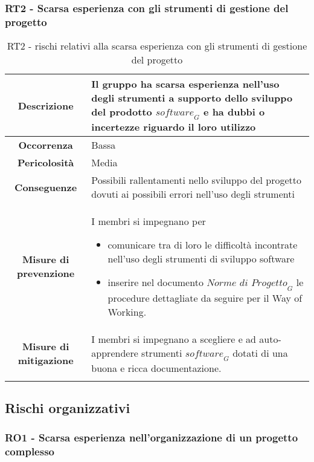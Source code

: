 \subsubsection[RT2]{RT2 - Scarsa esperienza con gli strumenti di gestione del progetto}\label{rt:2}
\begin{longtable}{|c|p{12cm}|}
\hline
\textbf{Descrizione} & Il gruppo ha scarsa esperienza nell'uso degli strumenti a supporto dello sviluppo del prodotto $\textit{software}_G$ e ha dubbi o incertezze riguardo il loro utilizzo \\
\hline
\textbf{Occorrenza} & Bassa \\
\hline
\textbf{Pericolosità} & Media \\
\hline
\textbf{Conseguenze} & Possibili rallentamenti nello sviluppo del progetto dovuti ai possibili errori nell'uso degli strumenti\\
\hline
\textbf{Misure di prevenzione} & 
I membri si impegnano per
\begin{itemize}
    \item comunicare tra di loro le difficoltà incontrate nell'uso degli strumenti di sviluppo software
    \item inserire nel documento $\textit{Norme di Progetto}_G$ le procedure dettagliate da seguire per il Way of Working.
\end{itemize} \\
\hline
\textbf{Misure di mitigazione} & I membri si impegnano a scegliere e ad auto-apprendere strumenti $\textit{software}_G$ dotati di una buona e ricca documentazione.\\
\hline
\caption{RT2 - rischi relativi alla scarsa esperienza con gli strumenti di gestione del progetto}
\end{longtable}

\subsection{Rischi organizzativi}
%
%
\subsubsection[RO1]{RO1 - Scarsa esperienza nell'organizzazione di un progetto complesso}  \label{ro:1} 
 
